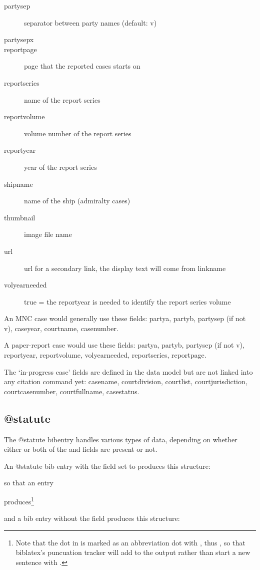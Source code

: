 \begin{description}
\item[partysep]separator between party names (default: v)
\item[partysepx]
\item[reportpage]page that the reported cases starts on
\item[reportseries]name of the report series
\item[reportvolume]volume number of the report series
\item[reportyear]year of the report series
\item[shipname]name of the ship (admiralty cases)
\item[thumbnail]image file name
\item[url]url for a secondary link, the display text will come from linkname
\item[volyearneeded]true = the reportyear is needed to identify the report series volume
\end{description}

\p An MNC case would generally use these fields: {\ttfamily
partya, 
partyb, 
partysep (if not v), 
caseyear, 
courtname, 
casenumber}.

\p A paper-report case would use these fields: {\ttfamily
partya, 
partyb, 
partysep (if not v), 
reportyear, 
reportvolume, 
volyearneeded, 
reportseries, 
reportpage}. 

\p The `in-progress case' fields are defined in the data model but are not linked into any citation command yet: {\ttfamily
casename, 
courtdivision, 
courtlist, 
courtjurisdiction, 
courtcasenumber, 
courtfullname, 
casestatus}.

\subsection{@statute}%
\p The @statute bibentry handles various types of data, depending on whether either or both of the  and  fields are present or not.

\p An @statute bib entry with the  field set to  produces this structure:

\begin{quotation}
\end{quotation}
so that an entry

produces\footnote{Note that the dot  in  is marked as an abbreviation dot with , thus , so that biblatex's puncuation tracker will add  to the output rather than start a new sentence with .}
\begin{quotation}
\end{quotation}
and a bib entry without the  field produces this structure:

